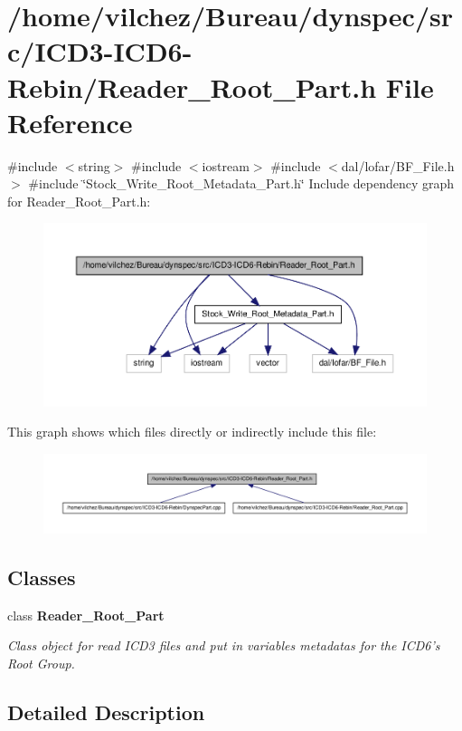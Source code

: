 \section{/home/vilchez/\-Bureau/dynspec/src/\-I\-C\-D3-\/\-I\-C\-D6-\/\-Rebin/\-Reader\-\_\-\-Root\-\_\-\-Part.h \-File \-Reference}
\label{_reader___root___part_8h}
{\ttfamily \#include $<$string$>$}\*
{\ttfamily \#include $<$iostream$>$}\*
{\ttfamily \#include $<$dal/lofar/\-B\-F\-\_\-\-File.\-h$>$}\*
{\ttfamily \#include \char`\"{}\-Stock\-\_\-\-Write\-\_\-\-Root\-\_\-\-Metadata\-\_\-\-Part.\-h\char`\"{}}\*
\-Include dependency graph for \-Reader\-\_\-\-Root\-\_\-\-Part.\-h\-:\nopagebreak
\begin{figure}[H]
\begin{center}
\leavevmode
\includegraphics[width=350pt]{_reader___root___part_8h__incl}
\end{center}
\end{figure}
\-This graph shows which files directly or indirectly include this file\-:\nopagebreak
\begin{figure}[H]
\begin{center}
\leavevmode
\includegraphics[width=350pt]{_reader___root___part_8h__dep__incl}
\end{center}
\end{figure}
\subsection*{\-Classes}
\begin{DoxyCompactItemize}
\item 
class {\bf \-Reader\-\_\-\-Root\-\_\-\-Part}
\begin{DoxyCompactList}\small\item\em \-Class object for read \-I\-C\-D3 files and put in variables metadatas for the \-I\-C\-D6's \-Root \-Group. \end{DoxyCompactList}\end{DoxyCompactItemize}


\subsection{\-Detailed \-Description}
